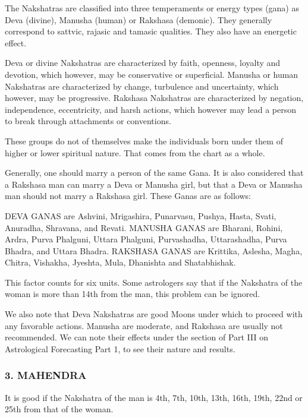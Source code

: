 The Nakshatras are classified into three temperaments or energy types (gana) as Deva (divine), Manusha (human) or Rakshasa (demonic). They generally correspond to sattvic, rajasic and tamasic qualities. They also have an energetic effect.

 

Deva or divine Nakshatras are characterized by faith, openness, loyalty and devotion, which however, may be conservative or superficial.
Manusha or human Nakshatras are characterized by change, turbulence and uncertainty, which however, may be progressive.
Rakshasa Nakshatras are characterized by negation, independence, eccentricity, and harsh actions, which however may lead a person to break through attachments or conventions.
 

These groups do not of themselves make the individuals born under them of higher or lower spiritual nature. That comes from the chart as a whole.

 

Generally, one should marry a person of the same Gana. It is also considered that a Rakshasa man can marry a Deva or Manusha girl, but that a Deva or Manusha man should not marry a Rakshasa girl. These Ganas are as follows:

 

DEVA GANAS are Ashvini, Mrigashira, Punarvasu, Pushya, Hasta, Svati, Anuradha, Shravana, and Revati.
MANUSHA GANAS are Bharani, Rohini, Ardra, Purva Phalguni, Uttara Phalguni, Purvashadha, Uttarashadha, Purva Bhadra, and Uttara Bhadra.
RAKSHASA GANAS are Krittika, Aslesha, Magha, Chitra, Vishakha, Jyeshta, Mula, Dhanishta and Shatabhishak.
 

This factor counts for six units. Some astrologers say that if the Nakshatra of the woman is more than 14th from the man, this problem can be ignored.

 

We also note that Deva Nakshatras are good Moons under which to proceed with any favorable actions. Manusha are moderate, and Rakshasa are usually not recommended. We can note their effects under the section of Part III on Astrological Forecasting Part 1, to see their nature and results.

 

\subsubsection{3. MAHENDRA}
 

It is good if the Nakshatra of the man is 4th, 7th, 10th, 13th, 16th, 19th, 22nd or 25th from that of the woman.


